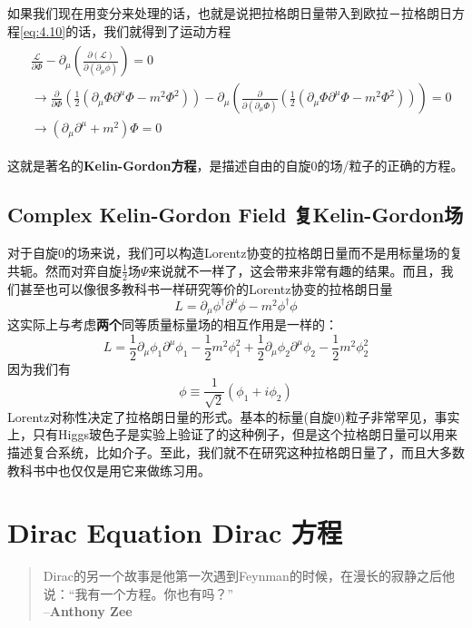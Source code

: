 如果我们现在用变分来处理的话，也就是说把拉格朗日量带入到欧拉－拉格朗日方程\eqref{eq:4.10}的话，我们就得到了运动方程
\begin{align}
\begin{split}
&\frac{\mathcal{L}}{\partial\Phi}-\partial_\mu\left(\frac{\partial(\mathcal{L})}{\partial(\partial_\mu\phi)}\right)=0\\
&\rightarrow\frac{\partial}{\partial\Phi}\left(\frac{1}{2}(\partial_\mu\Phi\partial^\mu\Phi-m^2\Phi^2)\right)-\partial_\mu\left(\frac{\partial}{\partial(\partial_\mu\Phi)}\left(\frac{1}{2}(\partial_\mu\Phi\partial^\mu\Phi-m^2\Phi^2)\right)\right)=0 \\
&\rightarrow(\partial_\mu\partial^\mu+m^2)\Phi=0
\end{split}
\end{align}

这就是著名的{\bf Kelin-Gordon方程}，是描述自由的自旋$0$的场/粒子的正确的方程。

\subsection[复Kelin-Gordon场]{Complex Kelin-Gordon Field 复Kelin-Gordon场}\label{sec6.2.1}

对于自旋$0$的场来说，我们可以构造Lorentz协变的拉格朗日量而不是用标量场的复共轭。然而对弈自旋$\frac{1}{2}$场$\Psi$来说就不一样了，这会带来非常有趣的结果。而且，我们甚至也可以像很多教科书一样研究等价的Lorentz协变的拉格朗日量
\[L=\partial_\mu\phi^\dagger\partial^\mu\phi-m^2\phi^\dagger\phi \]
这实际上与考虑{\bf 两个}同等质量标量场的相互作用是一样的：
\[L=\frac{1}{2}\partial_\mu\phi_1\partial^\mu\phi_1-\frac{1}{2}m^2\phi_1^2+\frac{1}{2}\partial_\mu\phi_2\partial^\mu\phi_2-\frac{1}{2}m^2\phi_2^2 \]
因为我们有
\[\phi\equiv\frac{1}{\sqrt2}(\phi_1+i\phi_2) \]
Lorentz对称性决定了拉格朗日量的形式。基本的标量(自旋$0$)粒子非常罕见，事实上，只有Higgs玻色子是实验上验证了的这种例子，但是这个拉格朗日量可以用来描述复合系统，比如介子。至此，我们就不在研究这种拉格朗日量了，而且大多数教科书中也仅仅是用它来做练习用。

\section[Dirac方程]{Dirac Equation Dirac 方程}\label{sec6.3}
\begin{quote}
Dirac的另一个故事是他第一次遇到Feynman的时候，在漫长的寂静之后他说：``我有一个方程。你也有吗？''\\
\phantom{Dirac的另一个故事是他第一次遇到}--{\bf Anthony Zee}
\end{quote}

